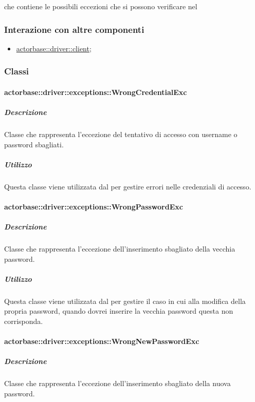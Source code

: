 \documentclass{scalatekids-article}
\begin{document}
 che contiene le possibili eccezioni che si possono verificare nel 

\subsubsection{Interazione con altre componenti}
\begin{itemize}
\item \hyperref[sec:actorbase::driver::client]{actorbase::driver::client};
\end{itemize}

\subsubsection{Classi}

\paragraph{actorbase::driver::exceptions::WrongCredentialExc}

\subparagraph{Descrizione}

Classe che rappresenta l'eccezione del tentativo di accesso con username o password sbagliati.

\subparagraph{Utilizzo}

Questa classe viene utilizzata dal  per gestire errori nelle credenziali di accesso.


\paragraph{actorbase::driver::exceptions::WrongPasswordExc}

\subparagraph{Descrizione}

Classe che rappresenta l'eccezione dell'inserimento sbagliato della vecchia password.

\subparagraph{Utilizzo}

Questa classe viene utilizzata dal  per gestire il caso in cui alla modifica della propria password, quando dovrei inserire la vecchia password questa non corrisponda.

\paragraph{actorbase::driver::exceptions::WrongNewPasswordExc}

\subparagraph{Descrizione}

Classe che rappresenta l'eccezione dell'inserimento sbagliato della nuova password.
\end{document}
